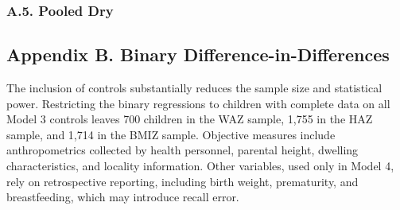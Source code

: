 \FloatBarrier

\clearpage
\subsubsection*{A.5. Pooled Dry}\label{app:pooled}


\FloatBarrier
\setcounter{table}{0}
\setcounter{figure}{0}
\setcounter{equation}{0}
\renewcommand{\thetable}{B\arabic{table}}
\renewcommand{\thefigure}{B\arabic{figure}}
\renewcommand{\theequation}{B\arabic{equation}}

\clearpage
\subsection*{Appendix B. Binary Difference-in-Differences}\label{app:binary}

\FloatBarrier


The inclusion of controls substantially reduces the sample size and statistical power. Restricting the binary regressions to children with complete data on all Model 3 controls leaves 700 children in the WAZ sample, 1,755 in the HAZ sample, and 1,714 in the BMIZ sample. Objective measures include anthropometrics collected by health personnel, parental height, dwelling characteristics, and locality information. Other variables, used only in Model 4, rely on retrospective reporting, including birth weight, prematurity, and breastfeeding, which may introduce recall error.

